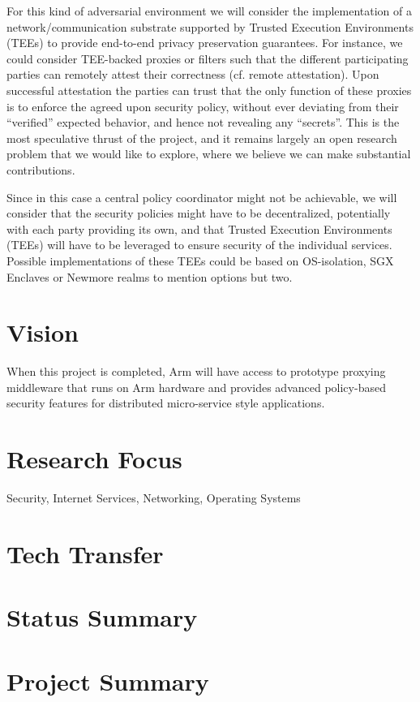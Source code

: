 \documentclass[a4paper%
]{article}
\begin{document}
\begin{enumerate}
  For this kind of adversarial environment we will consider the
  implementation of a network/communication substrate supported by
  Trusted Execution Environments (TEEs) to provide end-to-end privacy
  preservation guarantees.
  For instance, we could consider TEE-backed proxies or filters such
  that the different participating parties can remotely attest their
  correctness (cf. remote attestation).
  Upon successful attestation the parties can trust that the only
  function of these proxies is to enforce the agreed upon security
  policy, without ever deviating from their ``verified'' expected
  behavior, and hence not revealing any ``secrets''. 
  This is the most speculative thrust of the project, and it remains
  largely an open research problem that we would like to explore,
  where we believe we can make substantial contributions. 

  Since in this case a central policy coordinator might not be
  achievable, we will consider that the security policies might have to
  be decentralized, potentially with each party providing its own, and
  that Trusted Execution Environments (TEEs) will have to be leveraged
  to ensure security of the individual services.
  Possible implementations of these TEEs could be based on
  OS-isolation, SGX Enclaves or Newmore realms to mention options but
  two.
\end{enumerate}

\section{Vision}

When this project is completed, Arm will have access to prototype
proxying middleware that runs on Arm hardware and provides advanced
policy-based security features for distributed micro-service style
applications.

\section{Research Focus}

Security, Internet Services, Networking, Operating Systems 

\section{Tech Transfer}

\section{Status Summary}

\section{Project Summary}


\end{document}
